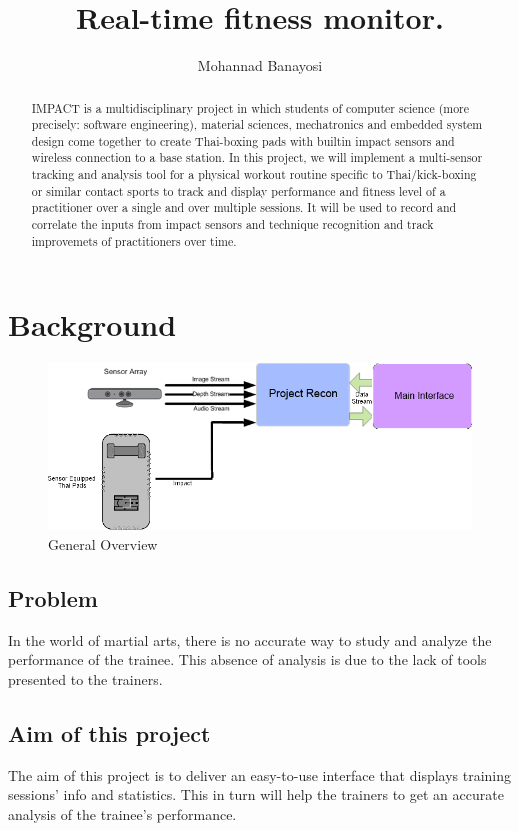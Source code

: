 \documentclass[a4paper]{article}
\author{Mohannad Banayosi}
\title{Real-time fitness monitor.}
\begin{document}
\maketitle

\begin{abstract}
IMPACT is a multidisciplinary project in which students of computer science (more precisely: software engineering), material sciences, mechatronics and embedded system design come together to create Thai-boxing pads with builtin impact sensors and wireless connection to a base station.
In this project, we will implement a multi-sensor tracking and analysis tool for a physical workout routine specific to Thai/kick-boxing or similar contact sports to track and display performance and fitness level of a practitioner over a single and over multiple sessions. It will be used to record and correlate the inputs from impact sensors and technique recognition and track improvemets of practitioners over time.
  
\end{abstract}

\newpage

\section{Background}
\begin{figure}[h!]
\centering
\includegraphics[scale=0.6]{General.png}
\caption{General Overview}
\label{threadsVsSync}
\end{figure}

\subsection{Problem}
In the world of martial arts, there is no accurate way to study and analyze the performance of the trainee. This absence of analysis is due to the lack of tools presented to the trainers.

\subsection{Aim of this project}
The aim of this project is to deliver an easy-to-use interface that displays training sessions' info and statistics. This in turn will help the trainers to get an accurate analysis of the trainee's performance.
\end{document}
